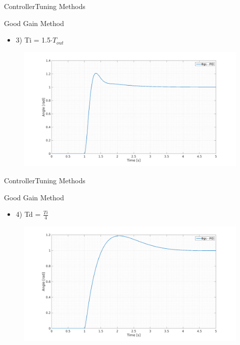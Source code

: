 \begin{frame}{Controller}{Tuning Methods}
  \begin{block}{Good Gain Method}
  
	  \begin{itemize}
	  	\item 3) Ti = 1.5$\cdot T_{out}$
	  \end{itemize}
	  \begin{figure}
       \includegraphics[scale=0.20]{../report/figures/GG3.png}
      \end{figure}
  
  \end{block}
\end{frame}

\begin{frame}{Controller}{Tuning Methods}
  \begin{block}{Good Gain Method}
  
	  \begin{itemize}
	  	\item 4) Td = $\frac{Ti}{4}$
	  \end{itemize}
	  \begin{figure}
       \includegraphics[scale=0.20]{../report/figures/GG4.png}
      \end{figure}
  
  \end{block}
\end{frame}

